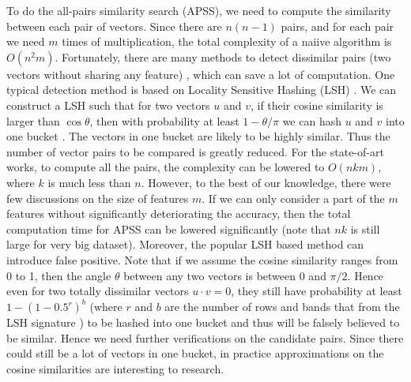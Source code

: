 \documentclass[sigconf,anonymous]{acmart}
\begin{document}
To do the all-pairs similarity search (APSS), we need to compute the similarity between each pair of vectors. Since there are $n(n-1)$ pairs, and for each pair we need $m$ times of multiplication, the total complexity of a naiive algorithm is $O(n^2 m)$. Fortunately, there are many methods to detect dissimilar pairs (two vectors without sharing any feature) \cite{ATY13,TAJY14,Lin09}, which can save a lot of computation. 
{\color{black} One typical detection method is based on Locality Sensitive Hashing (LSH) \cite{LRU14}. We can construct a LSH such that for two vectors $u$ and $v$, if their cosine similarity is larger than $\cos \theta$, then with probability at least $1-\theta/\pi$ we can hash $u$ and $v$ into one bucket \cite{LRU14}. The vectors in one bucket are likely to be highly similar. Thus the number of vector pairs to be compared is greatly reduced.} 
For the state-of-art works, to compute all the pairs, the complexity can be lowered to $O(nkm)$, where $k$ is much less than $n$. However, to the best of our knowledge, there were few discussions on the size of features $m$. If we can only consider a part of the $m$ features without significantly deteriorating the accuracy, then the total computation time for APSS can be lowered significantly (note that $nk$ is still large for very big dataset). {\color{black}Moreover, the popular LSH based method can introduce false positive. Note that if we assume the cosine similarity ranges from 0 to 1, then the angle $\theta$ between any two vectors is between 0 and $\pi/2$. Hence even for two totally dissimilar vectors $u\cdot v = 0$, they still have probability at least $1 - (1-0.5^r)^b$ (where $r$ and $b$ are the number of rows and bands that from the LSH signature \cite{LRU14}) to be hashed into one bucket and thus will be falsely believed to be similar. Hence we need further verifications on the candidate pairs. Since there could still be a lot of vectors in one bucket, in practice approximations on the cosine similarities are interesting to research.}
\end{document}
